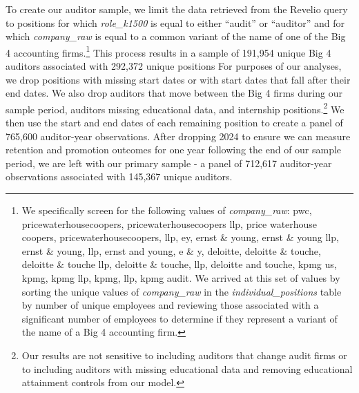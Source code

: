 \documentclass[11pt]{article}
\begin{document}
        To create our auditor sample, we limit the data retrieved from the Revelio query to positions for which \textit{role\_k1500} is equal to either ``audit'' or ``auditor'' and for which \textit{company\_raw} is equal to a common variant of the name of one of the Big 4 accounting firms.\footnote{We specifically screen for the following values of \textit{company\_raw}: pwc, pricewaterhousecoopers, pricewaterhousecoopers llp, price waterhouse coopers, pricewaterhousecoopers, llp, ey, ernst \& young, ernst \& young llp, ernst \& young, llp, ernst and young, e \& y, deloitte, deloitte \& touche, deloitte \& touche llp, deloitte \& touche, llp, deloitte and touche, kpmg us, kpmg, kpmg llp, kpmg, llp, kpmg audit. We arrived at this set of values by sorting the unique values of \textit{company\_raw} in the \textit{individual\_positions} table by number of unique employees and reviewing those associated with a significant number of employees to determine if they represent a variant of the name of a Big 4 accounting firm.\label{footnote:firmNames}} This process results in a sample of 191,954 unique Big 4 auditors associated with 292,372 unique positions For purposes of our analyses, we drop positions with missing start dates or with start dates that fall after their end dates. We also drop auditors that move between the Big 4 firms during our sample period, auditors missing educational data, and internship positions.\footnote{Our results are not sensitive to including auditors that change audit firms or to including auditors with missing educational data and removing educational attainment controls from our model.} We then use the start and end dates of each remaining position to create a panel of 765,600 auditor-year observations. After dropping 2024 to ensure we can measure retention and promotion outcomes for one year following the end of our sample period, we are left with our primary sample - a panel of 712,617 auditor-year observations associated with 145,367 unique auditors.
        
\end{document}
